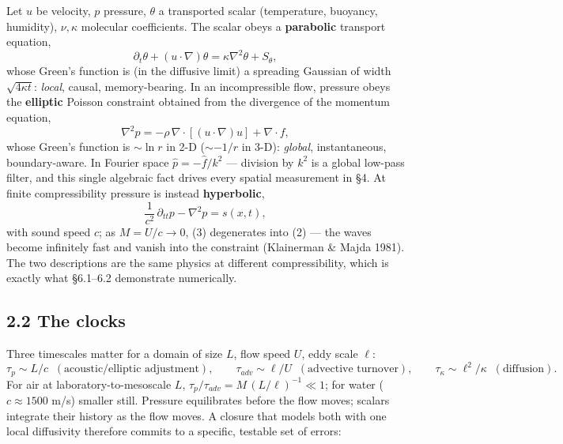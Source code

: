 \documentclass[aps,prfluids,preprint,superscriptaddress,nofootinbib]{revtex4-2}
\begin{document}
Let $u$ be velocity, $p$ pressure, $\theta$ a transported scalar (temperature, buoyancy, humidity), $\nu,\kappa$ molecular coefficients. The scalar obeys a \textbf{parabolic} transport equation,
\[
\partial_{t}\theta + (u\cdot\nabla)\theta = \kappa\nabla^{2}\theta + S_{\theta},
\tag{1}
\]
whose Green's function is (in the diffusive limit) a spreading Gaussian of width $\sqrt{4\kappa t}$: \emph{local}, causal, memory-bearing. In an incompressible flow, pressure obeys the \textbf{elliptic} Poisson constraint obtained from the divergence of the momentum equation,
\[
\nabla^{2}p = -\rho\,\nabla\!\cdot\!\left[(u\cdot\nabla)u\right] + \nabla\!\cdot\! f,
\tag{2}
\]
whose Green's function is $\sim\ln r$ in 2-D ($\sim -1/r$ in 3-D): \emph{global}, instantaneous, boundary-aware. In Fourier space $\hat{p}=-\widehat{f}/k^{2}$ --- division by $k^{2}$ is a global low-pass filter, and this single algebraic fact drives every spatial measurement in \S4. At finite compressibility pressure is instead \textbf{hyperbolic},
\[
\frac{1}{c^{2}}\,\partial_{tt}p - \nabla^{2}p = s(x,t),
\tag{3}
\]
with sound speed $c$; as $M=U/c\to 0$, (3) degenerates into (2) --- the waves become infinitely fast and vanish into the constraint (Klainerman \& Majda 1981). The two descriptions are the same physics at different compressibility, which is exactly what \S6.1--6.2 demonstrate numerically.

\subsection*{2.2 The clocks}

Three timescales matter for a domain of size $L$, flow speed $U$, eddy scale $\ell$:
\[
\tau_{p}\sim L/c \;\;(\text{acoustic/elliptic adjustment}), \qquad
\tau_{adv}\sim \ell/U \;\;(\text{advective turnover}), \qquad
\tau_{\kappa}\sim \ell^{2}/\kappa \;\;(\text{diffusion}).
\tag{4}
\]
For air at laboratory-to-mesoscale $L$, $\tau_{p}/\tau_{adv}=M\,(L/\ell)^{-1}\ll 1$; for water ($c\approx 1500$ m/s) smaller still. Pressure equilibrates before the flow moves; scalars integrate their history as the flow moves. A closure that models both with one local diffusivity therefore commits to a specific, testable set of errors:
\end{document}
